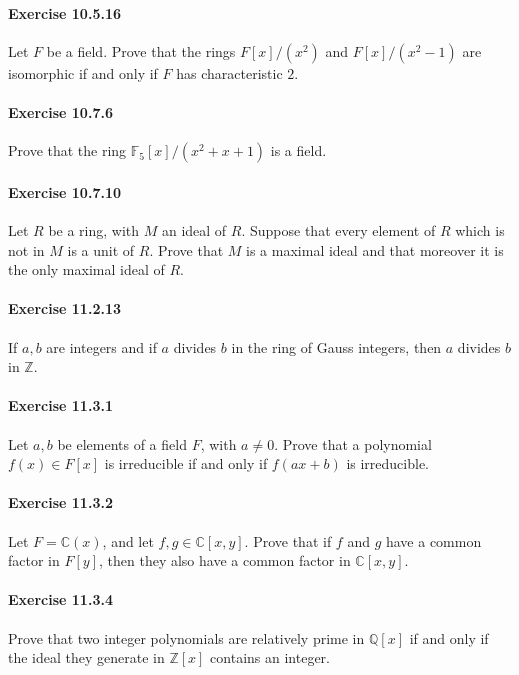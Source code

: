 \documentclass{article}
\begin{document}
\paragraph{Exercise 10.5.16} Let $F$ be a field. Prove that the rings $F[x] /\left(x^2\right)$ and $F[x] /\left(x^2-1\right)$ are isomorphic if and only if $F$ has characteristic $2 .$

\paragraph{Exercise 10.7.6} Prove that the ring $\mathbb{F}_5[x] /\left(x^2+x+1\right)$ is a field.

\paragraph{Exercise 10.7.10} Let $R$ be a ring, with $M$ an ideal of $R$. Suppose that every element of $R$ which is not in $M$ is a unit of $R$. Prove that $M$ is a maximal ideal and that moreover it is the only maximal ideal of $R$.

\paragraph{Exercise 11.2.13} If $a, b$ are integers and if $a$ divides $b$ in the ring of Gauss integers, then $a$ divides $b$ in $\mathbb{Z}$.

\paragraph{Exercise 11.3.1} Let $a, b$ be elements of a field $F$, with $a \neq 0$. Prove that a polynomial $f(x) \in F[x]$ is irreducible if and only if $f(a x+b)$ is irreducible.

\paragraph{Exercise 11.3.2} Let $F=\mathbb{C}(x)$, and let $f, g \in \mathbb{C}[x, y]$. Prove that if $f$ and $g$ have a common factor in $F[y]$, then they also have a common factor in $\mathbb{C}[x, y]$.

\paragraph{Exercise 11.3.4} Prove that two integer polynomials are relatively prime in $\mathbb{Q}[x]$ if and only if the ideal they generate in $\mathbb{Z}[x]$ contains an integer.
\end{document}
